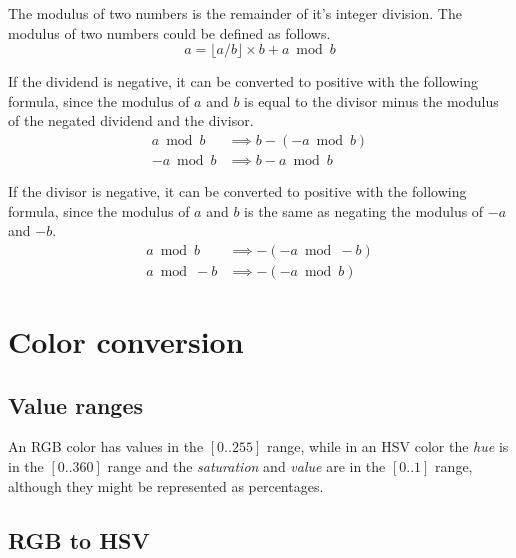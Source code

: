 \documentclass{amsart}
\begin{document}
The modulus of two numbers is the remainder of it's integer division. The
modulus of two numbers could be defined as follows.
\begin{displaymath}
  a = \lfloor a / b \rfloor \times b + a \bmod b
\end{displaymath}

If the dividend is negative, it can be converted to positive with the following
formula, since the modulus of $a$ and $b$ is equal to the divisor minus the
modulus of the negated dividend and the divisor.
\begin{align*}
  a \bmod b & \implies b - (-a \bmod b) \\
  -a \bmod b & \implies b - a \bmod b
\end{align*}

If the divisor is negative, it can be converted to positive with the following
formula, since the modulus of $a$ and $b$ is the same as negating the modulus of
$-a$ and $-b$.
\begin{align*}
  a \bmod b  & \implies - \left(-a \bmod -b \right) \\
  a \bmod -b & \implies - \left(-a \bmod b \right)
\end{align*}

\newpage
\section{Color conversion}

\subsection{Value ranges}

An RGB color has values in the $[0..255]$ range, while in an HSV color the
\textit{hue} is in the $[0..360]$ range and the \textit{saturation} and
\textit{value} are in the $[0..1]$ range, although they might be represented as
percentages.

\subsection{RGB to HSV}
\end{document}
